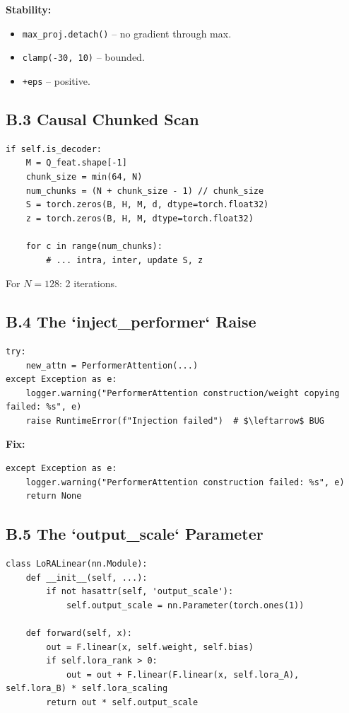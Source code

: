 \textbf{Stability:}
\begin{itemize}
\item \texttt{max\_proj.detach()} -- no gradient through max.
\item \texttt{clamp(-30, 10)} -- bounded.
\item \texttt{+eps} -- positive.

\end{itemize}
\subsection{B.3 Causal Chunked Scan}

\begin{lstlisting}
if self.is_decoder:
    M = Q_feat.shape[-1]
    chunk_size = min(64, N)
    num_chunks = (N + chunk_size - 1) // chunk_size
    S = torch.zeros(B, H, M, d, dtype=torch.float32)
    z = torch.zeros(B, H, M, dtype=torch.float32)
    
    for c in range(num_chunks):
        # ... intra, inter, update S, z
\end{lstlisting}

For $N = 128$: 2 iterations.

\subsection{B.4 The `inject\_performer` Raise}

\begin{lstlisting}
try:
    new_attn = PerformerAttention(...)
except Exception as e:
    logger.warning("PerformerAttention construction/weight copying failed: %s", e)
    raise RuntimeError(f"Injection failed")  # $\leftarrow$ BUG
\end{lstlisting}

\textbf{Fix:}

\begin{lstlisting}
except Exception as e:
    logger.warning("PerformerAttention construction failed: %s", e)
    return None
\end{lstlisting}

\subsection{B.5 The `output\_scale` Parameter}

\begin{lstlisting}
class LoRALinear(nn.Module):
    def __init__(self, ...):
        if not hasattr(self, 'output_scale'):
            self.output_scale = nn.Parameter(torch.ones(1))
    
    def forward(self, x):
        out = F.linear(x, self.weight, self.bias)
        if self.lora_rank > 0:
            out = out + F.linear(F.linear(x, self.lora_A), self.lora_B) * self.lora_scaling
        return out * self.output_scale
\end{lstlisting}

